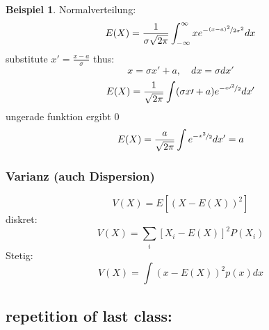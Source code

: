 \documentclass[a4paper]{article}
\theoremstyle{definition}
\newtheorem{beispiel}{Beispiel}%
\theoremstyle{remark}
\begin{document}
\begin{beispiel}
  
 Normalverteilung:\\
\begin{equation*}
  E(X)= \frac{1}{\sigma \sqrt{2\pi }}\int_{-\infty}^{\infty}xe^{-\nicefrac{(x-a)^2}{2\sigma ^2}}dx
\end{equation*}
    substitute
    $x'=\frac{x-a}{\sigma }$    thus:
    \begin{equation}
      x=\sigma x'+a , \quad dx=\sigma dx'
    \end{equation}
    \begin{equation}
      E(X)=\frac{1}{\sqrt{2\pi}}\int (\sigma x\prime+a)e^{-\nicefrac{ { x\prime}^2}{2}}dx'
    \end{equation}
    ungerade funktion ergibt 0
    \begin{equation*}
    E(X)=\frac{a}{\sqrt{2\pi}}\int e^{-\nicefrac{x^2}{2}}dx'=a
    \end{equation*}
    \subsubsection{Varianz (auch Dispersion)}
\label{ssub:varianz_auch_dispersion_}

  \begin{equation*}
    V(X)=E\left[  (X-E(X))^2\right] 
  \end{equation*}
  diskret:\\
  \begin{equation*}
    V(X)=\sum_i[X_i-E(X)]^2 P(X_i)
  \end{equation*}
  Stetig:
  \begin{equation*}
  V(X)=\int \left(  x-E(X)\right)^2 p(x)dx
  \end{equation*}
  \subsection*{repetition of last class:}
  \label{sub:repetition}
  

\end{beispiel}
\end{document}
